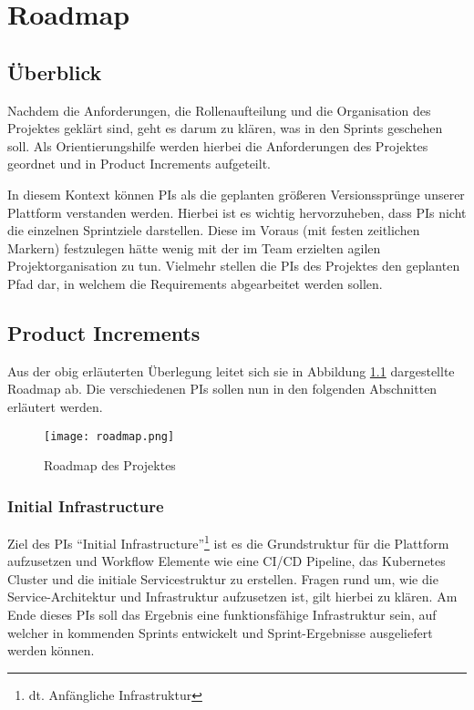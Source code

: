
\chapter{Roadmap}

\section{Überblick}
Nachdem die Anforderungen, die Rollenaufteilung und die Organisation des Projektes geklärt sind, geht es darum zu klären, was in den Sprints geschehen soll.
Als Orientierungshilfe werden hierbei die Anforderungen des Projektes geordnet und in Product Increments aufgeteilt.

In diesem Kontext können \acp{PI} als die geplanten größeren Versionssprünge unserer Plattform verstanden werden.
Hierbei ist es wichtig hervorzuheben, dass \acp{PI} nicht die einzelnen Sprintziele darstellen.
Diese im Voraus (mit festen zeitlichen Markern) festzulegen hätte wenig mit der im Team erzielten agilen Projektorganisation zu tun.
Vielmehr stellen die \acp{PI} des Projektes den geplanten Pfad dar, in welchem die Requirements abgearbeitet werden sollen.

\section{Product Increments}
Aus der obig erläuterten Überlegung leitet sich sie in Abbildung \ref{fig:roadmap} dargestellte Roadmap ab.
Die verschiedenen \acp{PI} sollen nun in den folgenden Abschnitten erläutert werden.

\begin{figure}
    \centering
    \texttt{[image: roadmap.png]}
    \caption{Roadmap des Projektes}
    \label{fig:roadmap}
\end{figure}

\subsection{Initial Infrastructure}
Ziel des \acp{PI} \enquote{Initial Infrastructure}\footnote{dt. Anfängliche Infrastruktur} ist es die Grundstruktur für die Plattform aufzusetzen und Workflow Elemente wie eine \ac{CI/CD} Pipeline, das Kubernetes Cluster und die initiale Servicestruktur zu erstellen.
Fragen rund um, wie die Service-Architektur und Infrastruktur aufzusetzen ist, gilt hierbei zu klären.
Am Ende dieses \acp{PI} soll das Ergebnis eine funktionsfähige Infrastruktur sein, auf welcher in kommenden Sprints entwickelt und Sprint-Ergebnisse ausgeliefert werden können.

